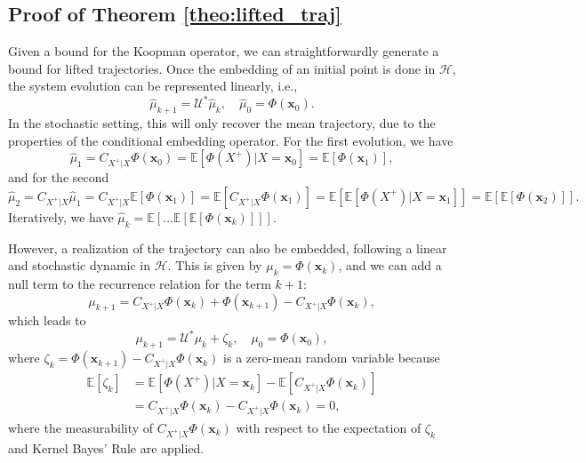\documentclass{article}
\newcommand{\U}{\mathcal{U}}
\begin{document}
\subsection{Proof of Theorem \ref{theo:lifted_traj}}

Given a bound for the Koopman operator, we can straightforwardly generate a bound for lifted trajectories. Once the embedding of an initial point is done in \( \mathcal{H} \), the system evolution can be represented linearly, i.e.,
\begin{equation}
    \label{eq:mean_exact}
    \hat{\mu}_{k+1} = \U^* \hat{\mu}_k, \quad \hat{\mu}_0 = \Phi(\mathbf{x}_0).
\end{equation}
In the stochastic setting, this will only recover the mean trajectory, due to the properties of the conditional embedding operator. For the first evolution, we have
\[
\hat{\mu}_1 = C_{X^+|X} \Phi(\mathbf{x}_0) = \mathbb{E}[\Phi(X^+)|X = \mathbf{x}_0] = \mathbb{E}[\Phi(\mathbf{x}_1)],
\]
and for the second
\[
\hat{\mu}_2 = C_{X^+|X} \hat{\mu}_1 = C_{X^+|X} \mathbb{E}[\Phi(\mathbf{x}_1)] = \mathbb{E}[C_{X^+|X} \Phi(\mathbf{x}_1)] = \mathbb{E}[\mathbb{E}[\Phi(X^+)|X = \mathbf{x}_1]] = \mathbb{E}[\mathbb{E}[\Phi(\mathbf{x}_2)]].
\]
Iteratively, we have \( \hat{\mu}_k = \mathbb{E}[\dots \mathbb{E}[\mathbb{E}[\Phi(\mathbf{x}_k)]]] \).

However, a realization of the trajectory can also be embedded, following a linear and stochastic dynamic in \( \mathcal{H} \). This is given by \( \mu_k = \Phi(\mathbf{x}_k) \), and we can add a null term to the recurrence relation for the term \( k+1 \):
\[
\mu_{k+1} = C_{X^+|X} \Phi(\mathbf{x}_k) + \Phi(\mathbf{x}_{k+1}) - C_{X^+|X} \Phi(\mathbf{x}_k),
\]
which leads to
\begin{equation}
    \label{eq:stoch_exact}
    \mu_{k+1} = \U^* \mu_k + \zeta_k, \quad \mu_0 = \Phi(\mathbf{x}_0),
\end{equation}
where \( \zeta_k = \Phi(\mathbf{x}_{k+1}) - C_{X^+|X} \Phi(\mathbf{x}_k) \) is a zero-mean random variable because
\[
\begin{aligned}
    \mathbb{E}[\zeta_k] 
    &= \mathbb{E}[\Phi(X^+)|X = \mathbf{x}_k] - \mathbb{E}[C_{X^+|X} \Phi(\mathbf{x}_k)] \\
    &= C_{X^+|X} \Phi(\mathbf{x}_k) - C_{X^+|X} \Phi(\mathbf{x}_k) = 0,
\end{aligned}
\]
where the measurability of \( C_{X^+|X} \Phi(\mathbf{x}_k) \) with respect to the expectation of \( \zeta_k \) and Kernel Bayes' Rule are applied.
\end{document}
